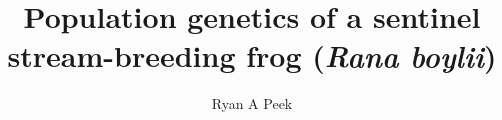 \documentclass[proquest,12pt,final]{ucthesis-CA2012} %
\begin{document}
\begin{ucfrontmatter}


  \title{Population genetics of a sentinel stream-breeding frog (\emph{Rana
boylii})}
  \author{Ryan A Peek}
   
  \othermemberC{} %
	
	\maketitle
	

  
    \begin{dedication}

      \vspace*{20ex} %
      \begin{center}
      \begin{large} %


\end{large}
\end{center}
\end{dedication}
\end{ucfrontmatter}
\end{document}

